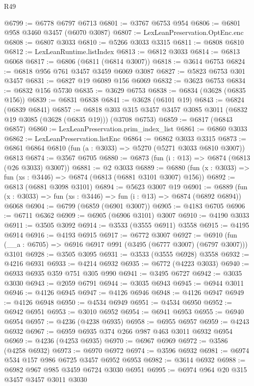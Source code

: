 \begin{lexlean}{R49}
\begin{coremodule}
@6799 := @6778 @6797 @6713
@6801 := @3767 @6753 @954
@6806 := @6801 @958 @3460 @3457 (@6070 @3087)
@6807 := LexLeanPreservation.OptEnc.enc
@6808 := @6807 @3033
@6810 := @5266 @3033 @3315
@6811 := @6808 @6810
@6812 := LexLeanRuntime.listIndex
@6813 := @6812 @3033
@6814 := @6813 @6068
@6817 := @6806 (@6811 (@6814 @3007))
@6818 := @3614 @6753
@6824 := @6818 @956 @761 @3457 @3459 @6069 @3087
@6827 := @5823 @6753 @301 @3457
@6831 := @6827 @19 @6089 @156 @6069
@6832 := @3623 @6753
@6834 := @6832 @156 @5730
@6835 := @3629 @6753
@6838 := @6834 (@3628 (@6835 @156))
@6839 := @6831 @6838
@6841 := @3628 (@6101 @19)
@6843 := @6824 (@6839 @6841)
@6857 := @6818 @303 @315 @3457 @3457 @3085 @3011 (@6832 @19 @3085 (@3628 (@6835 @19))) (@3708 @6753)
@6859 := @6817 (@6843 @6857)
@6860 := LexLeanPreservation.prim_index_list
@6861 := @6860 @3033
@6862 := LexLeanPreservation.listEnc
@6864 := @6862 @3033 @3315
@6873 := @6861 @6864 @6810 (fun (a : @3033) => @5270 (@5271 @3033 @6810 @3007)) @6813
@6874 := @3567 @6705
@6880 := @6873 (fun (i : @13) => @6874 (@6813 (@26 @3033) @3007))
@6881 := @2 @3033
@6889 := @6880 (fun (x : @3033) => fun (xs : @3446) => @6874 (@6813 (@6881 @3101 @3007) @156))
@6892 := @6813 (@6881 @3098 @3101)
@6894 := @5623 @3007 @19
@6901 := @6889 (fun (x : @3033) => fun (xs : @3446) => fun (i : @13) => @6874 (@6892 @6894)) @6068
@6904 := @6799 (@6859 (@6901 @3007))
@6905 := @4183 @6705
@6906 := @6711 @6362
@6909 := @6905 (@6906 @3101) @3007
@6910 := @4190 @3033
@6911 := @3505 @3092
@6914 := @3533 (@3555 @6911) @3558
@6915 := @4195 @6914
@6916 := @4193 @6915
@6917 := @6772 @3007
@6927 := @6910 (fun (__a : @6705) => @6916 @6917 @991 (@3495 (@6777 @3007) (@6797 @3007))) @3101
@6928 := @3505 @3095
@6931 := @3533 (@3555 @6928) @3558
@6932 := @4216 @6931
@6933 := @4214 @6932
@6935 := @6772 (@4223 @3033)
@6940 := @6933 @6935 @359 @751 @305 @990
@6941 := @3495 @6727
@6942 := @3035 @3030
@6943 := @2059 @6791
@6944 := @3035 @6943
@6945 := @6944 @3011
@6946 := @4126 @6945
@6947 := @4126 @6946
@6948 := @4126 @6947
@6949 := @4126 @6948
@6950 := @4534 @6949
@6951 := @4534 @6950
@6952 := @6942 @6951
@6953 := @3010 @6952
@6954 := @6941 @6953
@6955 := @6940 @6954
@6957 := @4236 (@4238 @6935)
@6958 := @6955 @6957
@6959 := @4243 @6932
@6967 := @6959 @6935 @374 @266 @987 @463 @3011 @6932 @6954
@6969 := @4236 (@4253 @6935)
@6970 := @6967 @6969
@6972 := @3586 (@4258 @6932)
@6973 := @6970 @6972
@6974 := @3596 @6932
@6981 := @6974 @534 @157 @986 @6725 @3457 @6952 @6953
@6982 := @3614 @6932
@6988 := @6982 @967 @985 @3459 @6724 @3030 @6951
@6995 := @6974 @964 @20 @315 @3457 @3457 @3011 @3030

\end{coremodule}
\end{lexlean}
